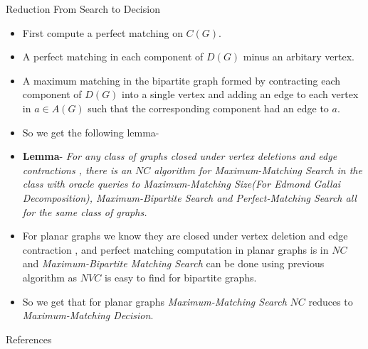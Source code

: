 \documentclass{beamer}
\begin{document}
\begin{frame}[allowframebreaks]{Reduction From Search to Decision}
\begin{itemize}
		\item First compute a perfect matching on $C(G)$.
		\item A perfect matching in each component of $D(G)$ minus an arbitary vertex.
		\item A maximum matching in the bipartite graph formed by contracting each component of $D(G)$ into a single vertex and adding an edge to each vertex in $a\in A(G)$ such that the corresponding  component had an edge to $a$.
		\item So we get the following lemma-
		\item \textbf{Lemma}- \textit{For any class of graphs closed under vertex deletions and edge contractions , there is an $NC$ algorithm for \textit{Maximum-Matching Search} in the class with oracle queries to \textit{Maximum-Matching Size}(For Edmond Gallai Decomposition), Maximum-Bipartite Search and Perfect-Matching Search all for the same class of graphs.}
		\item For planar graphs we know they are closed under vertex deletion and edge contraction , and perfect matching computation in planar graphs is in $NC$ and \textit{Maximum-Bipartite Matching Search} can be done using previous algorithm as $NVC $ is easy to find for bipartite graphs.
		\item So we get that for  planar graphs \textit{Maximum-Matching Search} $NC$ reduces to \textit{Maximum-Matching Decision}.
	\end{itemize}

\end{frame}
	\begin{frame}[allowframebreaks]{References}
		
		\printbibliography[heading=none]
			
	\end{frame}
	
\end{document}
